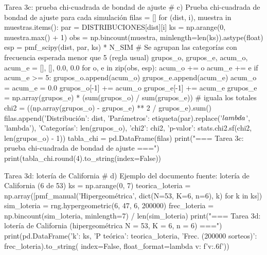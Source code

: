 \documentclass[11pt,letterpaper]{article}
\begin{document}
\begin{codigo}[label=cod:t3c]{Tarea 3c: prueba chi-cuadrada de bondad de ajuste}
# c) Prueba chi-cuadrada de bondad de ajuste para cada simulación
filas = []
for (dist, i), muestra in muestras.items():
    par = DISTRIBUCIONES[dist][i]
    ks = np.arange(0, muestra.max() + 1)
    obs = np.bincount(muestra, minlength=len(ks)).astype(float)
    esp = pmf_scipy(dist, par, ks) * N_SIM
    # Se agrupan las categorías con frecuencia esperada menor que 5 (regla usual)
    grupos_o, grupos_e, acum_o, acum_e = [], [], 0.0, 0.0
    for o, e in zip(obs, esp):
        acum_o += o
        acum_e += e
        if acum_e >= 5:
            grupos_o.append(acum_o)
            grupos_e.append(acum_e)
            acum_o = acum_e = 0.0
    grupos_o[-1] += acum_o
    grupos_e[-1] += acum_e
    grupos_e = np.array(grupos_e) * (sum(grupos_o) / sum(grupos_e))  # iguala los totales
    chi2 = ((np.array(grupos_o) - grupos_e) ** 2 / grupos_e).sum()
    filas.append({'Distribución': dist, 'Parámetros': etiqueta(par).replace('$\\lambda$', 'lambda'),
                  'Categorías': len(grupos_o), 'chi2': chi2,
                  'p-valor': stats.chi2.sf(chi2, len(grupos_o) - 1)})
tabla_chi = pd.DataFrame(filas)
print("\n=== Tarea 3c: prueba chi-cuadrada de bondad de ajuste ===")
print(tabla_chi.round(4).to_string(index=False))
\end{codigo}
\begin{codigo}[label=cod:t3d]{Tarea 3d: lotería de California}
# d) Ejemplo del documento fuente: lotería de California (6 de 53)
ks = np.arange(0, 7)
teorica_loteria = np.array([pmf_manual('Hipergeométrica', dict(N=53, K=6, n=6), k) for k in ks])
sim_loteria = rng.hypergeometric(6, 47, 6, 200000)
frec_loteria = np.bincount(sim_loteria, minlength=7) / len(sim_loteria)
print("\n=== Tarea 3d: lotería de California (hipergeométrica N = 53, K = 6, n = 6) ===")
print(pd.DataFrame({'k': ks, 'P teórica': teorica_loteria,
                    'Frec. (200000 sorteos)': frec_loteria}).to_string(
    index=False, float_format=lambda v: f'{v:.6f}'))
\end{codigo}
\end{document}
